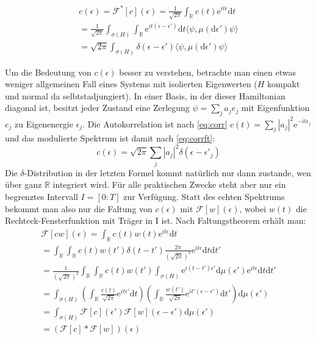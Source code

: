 \documentclass[10pt,a4paper,german]{scrartcl}
\begin{document}
		\begin{multline}
			\label{eq:corrft}
			c(\epsilon) = \mathcal{F}^{*}[c](\epsilon)
			      = \frac{1}{\sqrt{2 \pi}}
			     		\int_{\mathbb{R}} c(t) \mathrm{e}^{it \epsilon} \mathrm{d}t\\
			     = \frac{1}{\sqrt{2 \pi}}
		     			\int_{\sigma(H)}
				     		\int_{\mathbb{R}} \mathrm{e}^{i t (\epsilon -\epsilon')}	\mathrm{d}t
					 		\langle \psi,\mu(\mathrm{d}\epsilon')\psi \rangle\\
			     = \sqrt{2 \pi}
			     		\int_{\sigma(H)} \delta(\epsilon -\epsilon')
					 		\langle \psi,\mu(\mathrm{d}\epsilon')\psi \rangle
		\end{multline}

		Um die Bedeutung von $c(\epsilon)$ besser zu verstehen, betrachte man einen
		etwas weniger allgemeinen Fall eines Systems mit isolierten Eigenwerten
		($H$ kompakt und normal da selbtstadjungiert). In einer Basis, in der
		dieser Hamiltonian diagonal ist, besitzt jeder Zustand eine Zerlegung
		$\psi=\sum_{j}{a_j e_j}$ mit Eigenfunktion $e_j$ zu Eigenenergie $\epsilon_j$.
		Die Autokorrelation ist nach \eqref{eq:corr}
		$c(t)= \sum_{j} |a_j|^2 \mathrm{e}^{-i t \epsilon_j}$ und das modulierte Spektrum
		ist damit nach \eqref{eq:corrft}:
		\begin{equation}
			c(\epsilon)=\sqrt{2 \pi}
				 \sum_{j} |a_j|^2 \delta(\epsilon-\epsilon'_j)
		\end{equation}
		Die $\delta$-Distribution in der letzten Formel kommt natürlich nur dann zustande,
		wen über ganz $\mathbb{R}$ integriert wird. Für alle praktischen Zwecke steht
		aber nur ein begrenztes Intervall $I=[0:T]$ zur Verfügung. Statt des echten
		Spektrums	bekommt man also nur die Faltung von $c(\epsilon)$ mit
		$\mathcal{F}[w](\epsilon)$,
		wobei $w(t)$ die Rechteck-Fensterfunktion mit Träger in I ist. Nach Faltungstheorem
		erhält man:
		\begin{multline}
			\mathcal{F}[c w](\epsilon)
				= \int_{\mathbb{R}} c(t) w(t) \mathrm{e}^{i t \epsilon} \mathrm{d}t \\
				= \int_{\mathbb{R}}
					 	\int_{\mathbb{R}}
					 		 c(t) w(t') \delta(t-t') \frac{2 \pi}{(\sqrt{2 \pi})^2}
					 		 	 \mathrm{e}^{i t \epsilon}
						\mathrm{d}t
					\mathrm{d}t'\\
				= \frac{1}{(\sqrt{2 \pi})^2} \int_{\mathbb{R}}
					 	\int_{\mathbb{R}}
					 		 c(t) w(t')
					 		   \int_{\sigma(H)} \mathrm{e}^{i (t - t')\epsilon'}
					 		   \mathrm{d}\mu(\epsilon')
					 		 	 \mathrm{e}^{i t \epsilon}
						\mathrm{d}t
					\mathrm{d}t'\\
				=
 		  	\int_{\sigma(H)}
					\left(\int_{\mathbb{R}}
						 \frac{c(t)}{\sqrt{2 \pi}} \mathrm{e}^{i t\epsilon'} \mathrm{d}t\right)
					\left(\int_{\mathbb{R}}
						\frac{w(t')}{\sqrt{2 \pi}}  \mathrm{e}^{i t' (\epsilon-\epsilon')}
							\mathrm{d}t'\right)
				\mathrm{d}\mu(\epsilon')\\
				= \int_{\sigma(H)}
	 		  		\mathcal{F}[c](\epsilon') \mathcal{F}[w](\epsilon-\epsilon')
					\mathrm{d}\mu(\epsilon')\\
				= (\mathcal{F}[c] * \mathcal{F}[w])(\epsilon)
		\end{multline}
\end{document}
